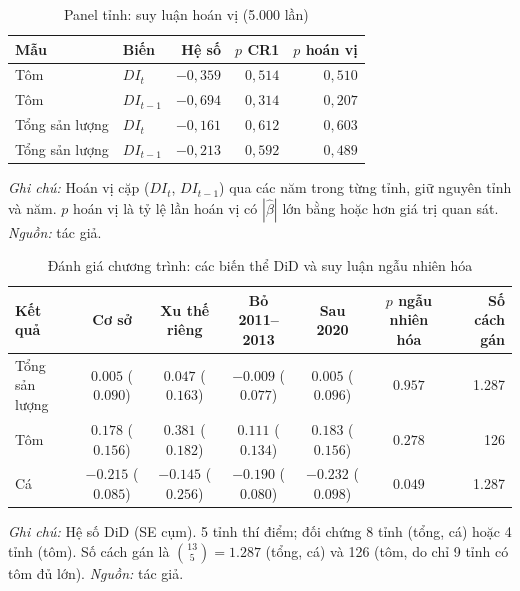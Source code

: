 \documentclass[12pt,a4paper]{article}
\begin{document}
\begin{table}[!tbp]
\centering\scriptsize
\caption{Panel tỉnh: suy luận hoán vị (5.000 lần)}
\label{tab:rA2}
\begin{tabular}{@{}llrrr@{}}
\toprule
Mẫu & Biến & Hệ số & $p$ CR1 & $p$ hoán vị\\
\midrule
Tôm & $DI_t$ & $-0{,}359$ & $0{,}514$ & $0{,}510$ \\
Tôm & $DI_{t-1}$ & $-0{,}694$ & $0{,}314$ & $0{,}207$ \\
Tổng sản lượng & $DI_t$ & $-0{,}161$ & $0{,}612$ & $0{,}603$ \\
Tổng sản lượng & $DI_{t-1}$ & $-0{,}213$ & $0{,}592$ & $0{,}489$ \\
\bottomrule
\end{tabular}
\begin{minipage}{\textwidth}\footnotesize
\textit{Ghi chú:} Hoán vị cặp ($DI_t$, $DI_{t-1}$) qua các năm trong từng tỉnh, giữ nguyên tỉnh và năm. $p$ hoán vị là tỷ lệ lần hoán vị có $|\hat\beta|$ lớn bằng hoặc hơn giá trị quan sát. \textit{Nguồn:} tác giả.
\end{minipage}
\end{table}

\begin{table}[!tbp]
\centering\scriptsize
\caption{Đánh giá chương trình: các biến thể DiD và suy luận ngẫu nhiên hóa}
\label{tab:rB}
\begin{tabular}{@{}lcccccr@{}}
\toprule
Kết quả & Cơ sở & Xu thế riêng & Bỏ 2011--2013 & Sau 2020 & $p$ ngẫu nhiên hóa & Số cách gán\\
\midrule
Tổng sản lượng & $0{.}005$ ($0{.}090$) & $0{.}047$ ($0{.}163$) & $-0{.}009$ ($0{.}077$) & $0{.}005$ ($0{.}096$) & $0{.}957$ & 1.287 \\
Tôm & $0{.}178$ ($0{.}156$) & $0{.}381$ ($0{.}182$) & $0{.}111$ ($0{.}134$) & $0{.}183$ ($0{.}156$) & $0{.}278$ & 126 \\
Cá & $-0{.}215$ ($0{.}085$) & $-0{.}145$ ($0{.}256$) & $-0{.}190$ ($0{.}080$) & $-0{.}232$ ($0{.}098$) & $0{.}049$ & 1.287 \\
\bottomrule
\end{tabular}
\begin{minipage}{\textwidth}\footnotesize
\textit{Ghi chú:} Hệ số DiD (SE cụm). 5 tỉnh thí điểm; đối chứng 8 tỉnh (tổng, cá) hoặc 4 tỉnh (tôm). Số cách gán là $\binom{13}{5}=1.287$ (tổng, cá) và 126 (tôm, do chỉ 9 tỉnh có tôm đủ lớn). \textit{Nguồn:} tác giả.
\end{minipage}
\end{table}
\end{document}
